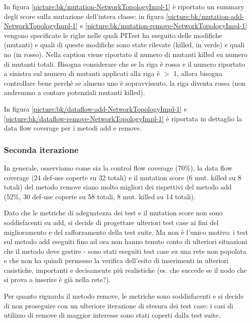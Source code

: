 \documentclass[10pt, a4paper]{article}
\newcommand{\getpicturelabel}[1]{picture:#1}
\begin{document}
	In figura \ref{\getpicturelabel{bk/mutation-NetworkTopologyImpl-1}} è riportato un summary degli
	score sulla mutazione dell'intera classe: in figura \ref{\getpicturelabel{bk/mutation-add-NetworkTopologyImpl-1}} 
	e \ref{\getpicturelabel{bk/mutation-remove-NetworkTopologyImpl-1}} vengono
	specificate le righe nelle quali PITest ha eseguito delle modifiche (mutanti) e quali di queste 
	modifiche sono state rilevate (killed, in verde) e quali no (in rosso). Nella caption viene 
	riportato
	il numero di mutanti killed su numero di mutanti totali. Bisogna considerare che se la riga è rossa
	e il numero riportato a sinistra sul numero di mutanti applicati alla riga è $>$ 1, allora bisogna
	controllare bene perchè se almeno uno è sopravvissuto, la riga diventa rossa (non andremmo a contare
	potenziali mutanti killed).
	
	In figura \ref{\getpicturelabel{bk/dataflow-add-NetworkTopologyImpl-1}} e 
	\ref{\getpicturelabel{bk/dataflow-remove-NetworkTopologyImpl-1}} 
	è riportata in dettaglio la data flow coverage per i metodi add e remove.
	
	\subsubsection{Seconda iterazione}
	In generale, osserviamo come sia la control flow coverage (70\%), la data flow coverage (24 def-use 
	coperte su 32 totali) e il mutation
	score (6 mut. killed su 8 totali) del metodo remove siano molto migliori dei rispettivi del metodo
	add (52\%, 30 def-use coperte su 58 totali, 8 mut. killed su 14 totali).
	
	Dato che le metriche di adeguatezza dei test e il mutation score non sono soddisfacenti su add,
	si decide di progettare ulteriori test case ai fini del miglioramento e del rafforzamento della test
	suite. Ma non è l'unico motivo: i test sul metodo add eseguiti fino ad ora non hanno tenuto conto
	di ulteriori situazioni che il metodo deve gestire - sono stati eseguiti test case su una rete
	non popolata e che non ha quindi permesso la verifica dell'esito di inserimenti in ulteriori 
	casistiche, importanti e decisamente più realistiche 
	(es. che succede se il nodo che si prova a inserire è già nella rete?).
	
	Per quanto riguarda il metodo remove, le metriche sono soddisfacenti e si decide di non proseguire 
	con un ulteriore iterazione di stesura dei test case: i casi di utilizzo di remove di maggior interesse
	sono stati coperti dalla test suite.
	
\end{document}
